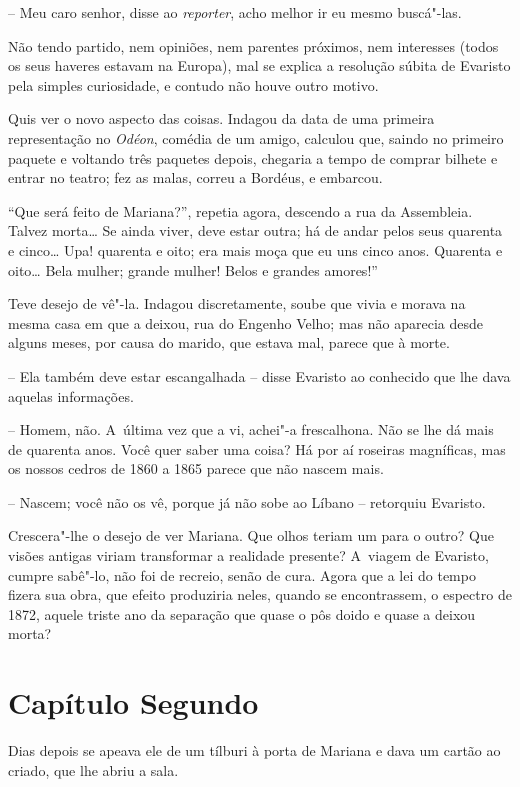 -- Meu caro senhor, disse ao \emph{reporter}, acho melhor ir eu mesmo
buscá"-las.

Não tendo partido, nem opiniões, nem parentes próximos, nem interesses
(todos os seus haveres estavam na Europa), mal se explica a resolução
súbita de Evaristo pela simples curiosidade, e contudo não houve outro
motivo.

Quis ver o novo aspecto das coisas. Indagou da data de uma primeira
representação no \emph{Odéon}, comédia de um amigo, calculou que, saindo
no primeiro paquete e voltando três paquetes depois, chegaria a tempo de
comprar bilhete e entrar no teatro; fez as malas, correu a Bordéus, e
embarcou.

``Que será feito de Mariana?'', repetia agora, descendo a rua da
Assembleia. Talvez morta\ldots{} Se ainda viver, deve estar outra; há de
andar pelos seus quarenta e cinco\ldots{} Upa! quarenta e oito; era mais moça
que eu uns cinco anos. Quarenta e oito\ldots{} Bela mulher; grande mulher!
Belos e grandes amores!''

Teve desejo de vê"-la. Indagou discretamente, soube que vivia e morava na
mesma casa em que a deixou, rua do Engenho Velho; mas não aparecia desde
alguns meses, por causa do marido, que estava mal, parece que à morte.

-- Ela também deve estar escangalhada -- disse Evaristo ao conhecido que
lhe dava aquelas informações.

-- Homem, não. A~última vez que a vi, achei"-a frescalhona. Não se lhe dá
mais de quarenta anos. Você quer saber uma coisa? Há por aí roseiras
magníficas, mas os nossos cedros de 1860 a 1865 parece que não nascem
mais.

-- Nascem; você não os vê, porque já não sobe ao Líbano -- retorquiu
Evaristo.

Crescera"-lhe o desejo de ver Mariana. Que olhos teriam um para o outro?
Que visões antigas viriam transformar a realidade presente? A~viagem de
Evaristo, cumpre sabê"-lo, não foi de recreio, senão de cura. Agora que a
lei do tempo fizera sua obra, que efeito produziria neles, quando se
encontrassem, o espectro de 1872, aquele triste ano da separação que
quase o pôs doido e quase a deixou morta?

\section{Capítulo Segundo}

Dias depois se apeava ele de um tílburi à porta de Mariana e dava um
cartão ao criado, que lhe abriu a sala.

